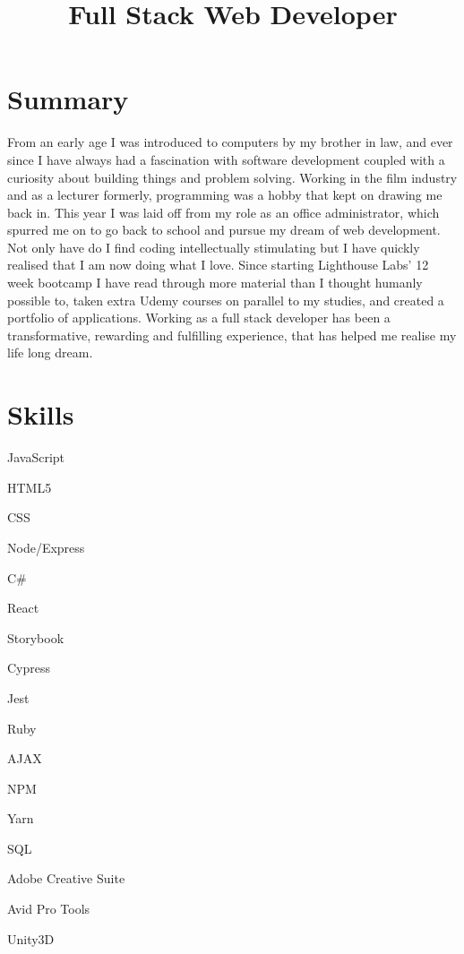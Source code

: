 \documentclass[11pt,a4paper,sans]{moderncv}
\title{Full Stack Web Developer} %
\begin{document}
\makecvtitle

\section{Summary} %
\label{sec:summary}

From an early age I was introduced to computers by my brother in law, and ever since I have always had a fascination with software development coupled with a curiosity about building things and problem solving. Working in the film industry and as a lecturer formerly, programming was a hobby that kept on drawing me back in. This year I was laid off from my role as an office administrator, which spurred me on to go back to school and pursue my dream of web development. Not only have do I find coding intellectually stimulating but I have quickly realised that I am now doing what I love. Since starting Lighthouse Labs' 12 week bootcamp I have read through more material than I thought humanly possible to, taken extra Udemy courses on parallel to my studies, and created a portfolio of applications. Working as a full stack developer has been a transformative, rewarding and fulfilling experience, that has helped me realise my life long dream.

\section{Skills}
\begin{itemize}
\begin{multicols}{3}
\item JavaScript
\item HTML5
\item CSS
\item Node/Express
\item C\#
\item React
\item Storybook
\item Cypress
\item Jest
\item Ruby
\item AJAX
\item NPM
\item Yarn
\item SQL
\item Adobe Creative Suite
\item Avid Pro Tools
\item Unity3D
\end{multicols}
\end{itemize}
\end{document}
